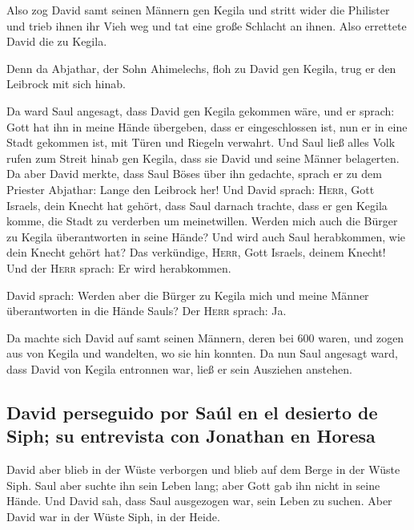  Also zog David samt seinen Männern gen Kegila und stritt
wider die Philister und trieb ihnen ihr Vieh weg und tat eine große
Schlacht an ihnen. Also errettete David die zu Kegila.

 Denn da Abjathar, der Sohn Ahimelechs, floh zu David gen
Kegila, trug er den Leibrock mit sich hinab.

 Da ward Saul angesagt, dass David gen Kegila gekommen
wäre, und er sprach: Gott hat ihn in meine Hände übergeben, dass er
eingeschlossen ist, nun er in eine Stadt gekommen ist, mit Türen und
Riegeln verwahrt.  Und Saul ließ alles Volk rufen zum
Streit hinab gen Kegila, dass sie David und seine Männer belagerten.
 Da aber David merkte, dass Saul Böses über ihn gedachte,
sprach er zu dem Priester Abjathar: Lange den Leibrock her!
 Und David sprach: \textsc{Herr}, Gott Israels, dein
Knecht hat gehört, dass Saul darnach trachte, dass er gen Kegila komme,
die Stadt zu verderben um meinetwillen.  Werden mich auch
die Bürger zu Kegila überantworten in seine Hände? Und wird auch Saul
herabkommen, wie dein Knecht gehört hat? Das verkündige, \textsc{Herr},
Gott Israels, deinem Knecht! Und der \textsc{Herr} sprach: Er wird
herabkommen.

 David sprach: Werden aber die Bürger zu Kegila mich und
meine Männer überantworten in die Hände Sauls? Der \textsc{Herr} sprach:
Ja.

 Da machte sich David auf samt seinen Männern, deren bei
600 waren, und zogen aus von Kegila und wandelten, wo sie hin konnten.
Da nun Saul angesagt ward, dass David von Kegila entronnen war, ließ er
sein Ausziehen anstehen.

\hypertarget{david-perseguido-por-sauxfal-en-el-desierto-de-siph-su-entrevista-con-jonathan-en-horesa}{%
\subsection{David perseguido por Saúl en el desierto de Siph; su
entrevista con Jonathan en
Horesa}\label{david-perseguido-por-sauxfal-en-el-desierto-de-siph-su-entrevista-con-jonathan-en-horesa}}

 David aber blieb in der Wüste verborgen und blieb auf
dem Berge in der Wüste Siph. Saul aber suchte ihn sein Leben lang; aber
Gott gab ihn nicht in seine Hände.  Und David sah, dass
Saul ausgezogen war, sein Leben zu suchen. Aber David war in der Wüste
Siph, in der Heide.

